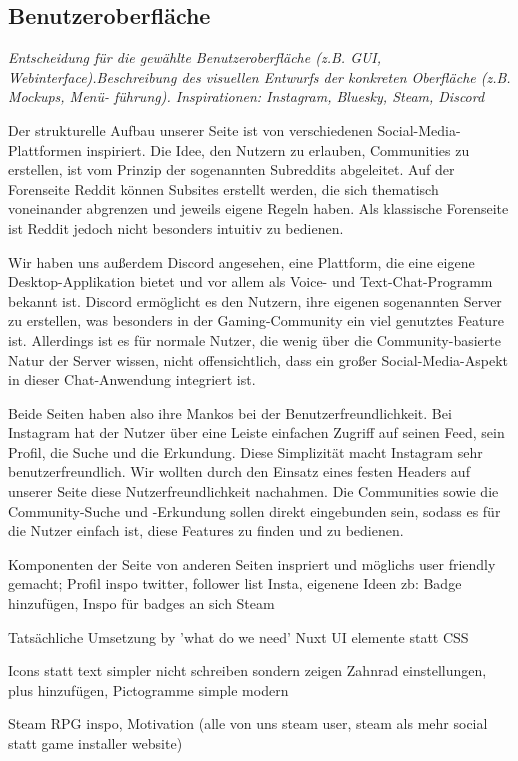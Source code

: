 \documentclass[a4paper,12pt]{article}
\begin{document}
\subsection{Benutzeroberfläche}
\textit{Entscheidung für die gewählte
Benutzeroberfläche (z.B. GUI, Webinterface).Beschreibung des visuellen Entwurfs der konkreten Oberfläche (z.B. Mockups,
Menü- führung). Inspirationen: Instagram, Bluesky, Steam, Discord}

Der strukturelle Aufbau unserer Seite ist von verschiedenen Social-Media-Plattformen inspiriert. Die Idee, den Nutzern zu erlauben, Communities zu erstellen, ist vom Prinzip der sogenannten Subreddits abgeleitet. Auf der Forenseite Reddit können Subsites erstellt werden, die sich thematisch voneinander abgrenzen und jeweils eigene Regeln haben. Als klassische Forenseite ist Reddit jedoch nicht besonders intuitiv zu bedienen.

Wir haben uns außerdem Discord angesehen, eine Plattform, die eine eigene Desktop-Applikation bietet und vor allem als Voice- und Text-Chat-Programm bekannt ist. Discord ermöglicht es den Nutzern, ihre eigenen sogenannten Server zu erstellen, was besonders in der Gaming-Community ein viel genutztes Feature ist. Allerdings ist es für normale Nutzer, die wenig über die Community-basierte Natur der Server wissen, nicht offensichtlich, dass ein großer Social-Media-Aspekt in dieser Chat-Anwendung integriert ist.

Beide Seiten haben also ihre Mankos bei der Benutzerfreundlichkeit. Bei Instagram hat der Nutzer über eine Leiste einfachen Zugriff auf seinen Feed, sein Profil, die Suche und die Erkundung. Diese Simplizität macht Instagram sehr benutzerfreundlich. Wir wollten durch den Einsatz eines festen Headers auf unserer Seite diese Nutzerfreundlichkeit nachahmen. Die Communities sowie die Community-Suche und -Erkundung sollen direkt eingebunden sein, sodass es für die Nutzer einfach ist, diese Features zu finden und zu bedienen.

Komponenten der Seite von anderen Seiten inspriert und möglichs user friendly gemacht; Profil inspo twitter, follower list Insta, eigenene Ideen zb: Badge hinzufügen, Inspo für badges an sich Steam

Tatsächliche Umsetzung by 'what do we need' Nuxt UI elemente statt CSS

Icons statt text simpler nicht schreiben sondern zeigen Zahnrad einstellungen, plus hinzufügen, Pictogramme simple modern

Steam RPG inspo, Motivation (alle von uns steam user, steam als mehr social statt game installer website)
\end{document}
